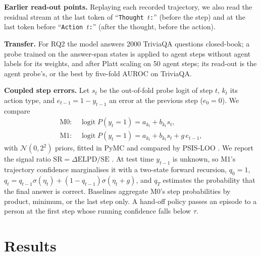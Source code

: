 \documentclass[10pt,twocolumn]{article}
\begin{document}
\textbf{Earlier read-out points.} Replaying each recorded trajectory, we also read the residual stream at the last
token of ``\texttt{Thought $t$:}'' (before the step) and at the last token before ``\texttt{Action $t$:}''
(after the thought, before the action).

\textbf{Transfer.} For RQ2 the model answers 2000 TriviaQA questions \citep{joshi2017triviaqa} closed-book; a probe
trained on the answer-span states is applied to agent steps without agent labels for its weights, and after Platt
scaling on 50 agent steps; its read-out is the agent probe's, or the best by five-fold AUROC on TriviaQA.

\textbf{Coupled step errors.} Let $s_t$ be the out-of-fold probe logit of step $t$, $k_t$ its action type, and
$e_{t-1}=1-y_{t-1}$ an error at the previous step ($e_0=0$). We compare
\begin{align*}
\text{M0: } & \operatorname{logit} P(y_t=1) = a_{k_t} + b_{k_t} s_t,\\
\text{M1: } & \operatorname{logit} P(y_t=1) = a_{k_t} + b_{k_t} s_t + g\, e_{t-1},
\end{align*}
with $\mathcal{N}(0,2^2)$ priors, fitted in PyMC \citep{abrilpla2023pymc} and compared by PSIS-LOO
\citep{vehtari2017practical}. We report the signal ratio $\mathrm{SR}=\Delta\mathrm{ELPD}/\mathrm{SE}$
\citep{shi2026bayesian}. At test time $y_{t-1}$ is unknown, so M1's trajectory confidence marginalises it with a
two-state forward recursion, $q_0=1$, $q_t = q_{t-1}\sigma(\eta_t) + (1-q_{t-1})\sigma(\eta_t+g)$, and
$q_T$ estimates the probability that the final answer is correct. Baselines aggregate M0's step probabilities by
product, minimum, or the last step only. A hand-off policy passes an episode to a person at the first step whose
running confidence falls below $\tau$.

\section{Results}
\end{document}
